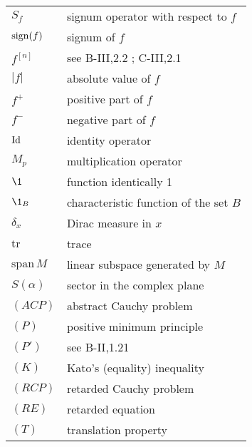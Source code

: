 \begin{longtable}{p{}p{}}
$S_{f}$ & signum operator with respect to $f$ \\ %
$\operatorname{sign}(f)$ & signum of $f$  \\ %
$f^{[n]}$ & see B-III,2.2 ; C-III,2.1 \\ %
$|f|$ & absolute value of $f$ \\ %
$f^{+}$ & positive part of $f$ \\ %
$f^{-}$ & negative part of $f$ \\ %
%
%
%
$\operatorname{Id}$ & identity operator \\ %
$M_{p}$ & multiplication operator \\ %
$\1$ & function identically 1 \\ %
$\1_{B}$ & characteristic function of the set $B$ \\ %
$\delta_{x}$ & Dirac measure in $x$ \\ %
$\text{tr}$ & trace \\ %
$\text{span}\,M$ & linear subspace generated by $M$ \\ %
$S(\alpha)$ & sector in the complex plane \\ %
$(ACP)$ & abstract Cauchy problem \\ %
$(P)$ & positive minimum principle \\ %
$(P')$ & see B-II,1.21 \\ %
$(K)$ & Kato's (equality) inequality \\ %
$(RCP)$ & retarded Cauchy problem \\ %
$(RE)$ & retarded equation \\ %
$(T)$ & translation property \\ %
\end{longtable}

